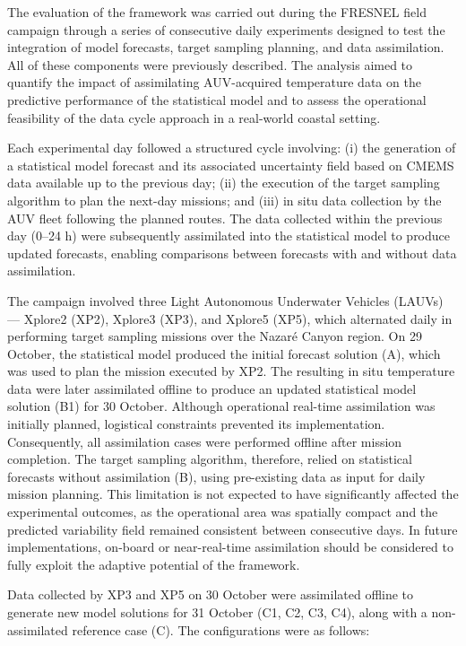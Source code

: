The evaluation of the framework was carried out during the FRESNEL
field campaign through a series of consecutive daily experiments
designed to test the integration of model forecasts, target sampling
planning, and data assimilation. All of these components were
previously described. The analysis aimed to quantify the impact of
assimilating AUV-acquired temperature data on the predictive
performance of the statistical model and to assess the operational
feasibility of the data cycle approach in a real-world coastal
setting.

Each experimental day followed a structured cycle involving: (i) the
generation of a statistical model forecast and its associated
uncertainty field based on CMEMS data available up to the previous
day; (ii) the execution of the target sampling algorithm to plan the
next-day missions; and (iii) in situ data collection by the AUV fleet
following the planned routes. The data collected within the previous
day (0–24 h) were subsequently assimilated into the statistical model
to produce updated forecasts, enabling comparisons between forecasts
with and without data assimilation.

The campaign involved three Light Autonomous Underwater Vehicles
(LAUVs) — Xplore2 (XP2), Xplore3 (XP3), and Xplore5 (XP5), which
alternated daily in performing target sampling missions over the
Nazaré Canyon region. On 29 October, the statistical model produced
the initial forecast solution (A), which was used to plan the mission
executed by XP2. The resulting in situ temperature data were later
assimilated offline to produce an updated statistical model solution
(B1) for 30 October. Although operational real-time assimilation was
initially planned, logistical constraints prevented its
implementation. Consequently, all assimilation cases were performed
offline after mission completion. The target sampling algorithm,
therefore, relied on statistical forecasts without assimilation (B),
using pre-existing data as input for daily mission planning. This
limitation is not expected to have significantly affected the
experimental outcomes, as the operational area was spatially compact
and the predicted variability field remained consistent between
consecutive days. In future implementations, on-board or
near-real-time assimilation should be considered to fully exploit the
adaptive potential of the framework.

Data collected by XP3 and XP5 on 30 October were assimilated offline
to generate new model solutions for 31 October (C1, C2, C3, C4), along
with a non-assimilated reference case (C). The configurations were as
follows:

